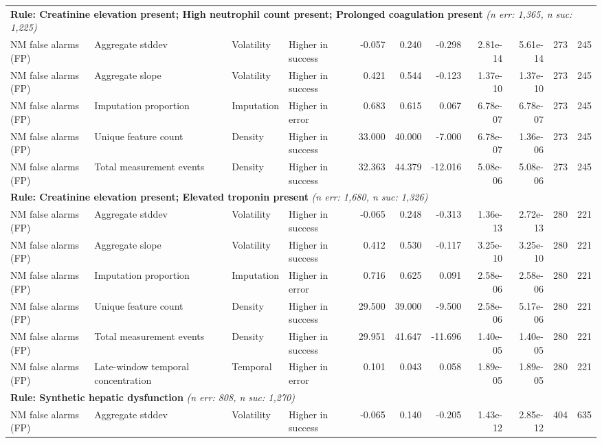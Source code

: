 \documentclass[border=0pt]{standalone}
\begin{document}
\begin{adjustbox}{width=\textwidth}
\begin{tabular}{@{}llllrrrrrrr@{}}
\multicolumn{11}{l}{\textbf{Rule: Creatinine elevation present; High neutrophil count present; Prolonged coagulation present} \textit{(n err: 1,365, n suc: 1,225)}} \\
NM false alarms (FP) & Aggregate stddev & Volatility & Higher in success & -0.057 & 0.240 & -0.298 & 2.81e-14 & 5.61e-14 & 273 & 245 \\
NM false alarms (FP) & Aggregate slope & Volatility & Higher in success & 0.421 & 0.544 & -0.123 & 1.37e-10 & 1.37e-10 & 273 & 245 \\
NM false alarms (FP) & Imputation proportion & Imputation & Higher in error & 0.683 & 0.615 & 0.067 & 6.78e-07 & 6.78e-07 & 273 & 245 \\
NM false alarms (FP) & Unique feature count & Density & Higher in success & 33.000 & 40.000 & -7.000 & 6.78e-07 & 1.36e-06 & 273 & 245 \\
NM false alarms (FP) & Total measurement events & Density & Higher in success & 32.363 & 44.379 & -12.016 & 5.08e-06 & 5.08e-06 & 273 & 245 \\
\multicolumn{11}{l}{\textbf{Rule: Creatinine elevation present; Elevated troponin present} \textit{(n err: 1,680, n suc: 1,326)}} \\
NM false alarms (FP) & Aggregate stddev & Volatility & Higher in success & -0.065 & 0.248 & -0.313 & 1.36e-13 & 2.72e-13 & 280 & 221 \\
NM false alarms (FP) & Aggregate slope & Volatility & Higher in success & 0.412 & 0.530 & -0.117 & 3.25e-10 & 3.25e-10 & 280 & 221 \\
NM false alarms (FP) & Imputation proportion & Imputation & Higher in error & 0.716 & 0.625 & 0.091 & 2.58e-06 & 2.58e-06 & 280 & 221 \\
NM false alarms (FP) & Unique feature count & Density & Higher in success & 29.500 & 39.000 & -9.500 & 2.58e-06 & 5.17e-06 & 280 & 221 \\
NM false alarms (FP) & Total measurement events & Density & Higher in success & 29.951 & 41.647 & -11.696 & 1.40e-05 & 1.40e-05 & 280 & 221 \\
NM false alarms (FP) & Late-window temporal concentration & Temporal & Higher in error & 0.101 & 0.043 & 0.058 & 1.89e-05 & 1.89e-05 & 280 & 221 \\
\multicolumn{11}{l}{\textbf{Rule: Synthetic hepatic dysfunction} \textit{(n err: 808, n suc: 1,270)}} \\
NM false alarms (FP) & Aggregate stddev & Volatility & Higher in success & -0.065 & 0.140 & -0.205 & 1.43e-12 & 2.85e-12 & 404 & 635 \\

\end{tabular}
\end{adjustbox}
\end{document}

